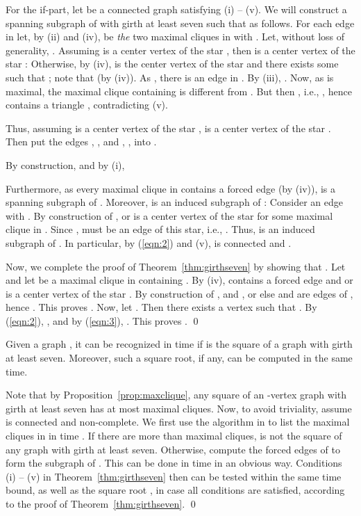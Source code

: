 \documentclass[proceedings]{stacs}
\newlength{\ai}
\begin{document}
For the if-part, let  be a connected graph satisfying (i) -- (v). We will construct a spanning
subgraph  of  with girth at least seven such that  as follows. For each edge  in
 let, by (ii) and (iv),  be \emph{the} two maximal cliques in  with .
Let, without loss of generality, .
Assuming  is a center vertex of the star , then  is a center vertex of the star :
Otherwise, by (iv),  is the center vertex of the star  and
  there exists some  such that ; note that  (by (iv)).
As , there is an edge  in . By (iii), .
Now, as  is maximal, the maximal clique  containing  is different from .
But then , i.e., , hence  contains a triangle ,
contradicting (v).

Thus, assuming  is a center vertex of the star ,  is a center vertex of the
star . Then put the edges , , and , , into .

By construction,  and by (i),


Furthermore, as every maximal clique in  contains a forced edge (by (iv)),  is a spanning
subgraph of . Moreover,  is an induced subgraph of : Consider an edge  with
. By construction of ,  or  is a center vertex of the star 
for some maximal clique  in . Since ,  must be an edge of this star, i.e.,
. Thus,  is an induced subgraph of . In particular, by (\ref{eqn:2}) and (v),
 is connected and .

Now, we complete the proof of Theorem~\ref{thm:girthseven} by showing that .
Let  and let  be a maximal clique in  containing
. By (iv),  contains a forced edge  and  or  is a center vertex of the star
. By construction of ,  and , or else  and  are edges of ,
hence . This proves .
Now, let . Then there exists a vertex  such that
. By (\ref{eqn:2}), , and by (\ref{eqn:3}), .
This proves . \qed

\begin{corollary}\label{coro:girthseven}
Given a graph , it can be recognized in  time if  is the
square of a graph  with girth at least seven. Moreover, such a square root, if any, can be
computed in the same time.
\end{corollary}
\proof Note that by Proposition~\ref{prop:maxclique}, any square of an -vertex graph with girth
at least seven has at most  maximal cliques. Now, to avoid triviality, assume  is connected
and non-complete. We first use the algorithm in \cite{TIAS} to list the maximal cliques in  in
time . If there are more than  maximal cliques,  is not the square of any graph
with girth at least seven. Otherwise, compute the forced edges of  to form the subgraph  of
. This can be done in time  in an obvious way.
Conditions (i) -- (v) in Theorem~\ref{thm:girthseven} then can
be tested within the same time bound, as well as the square root , in case all conditions are
satisfied, according to the proof of Theorem~\ref{thm:girthseven}. \qed
\end{document}
